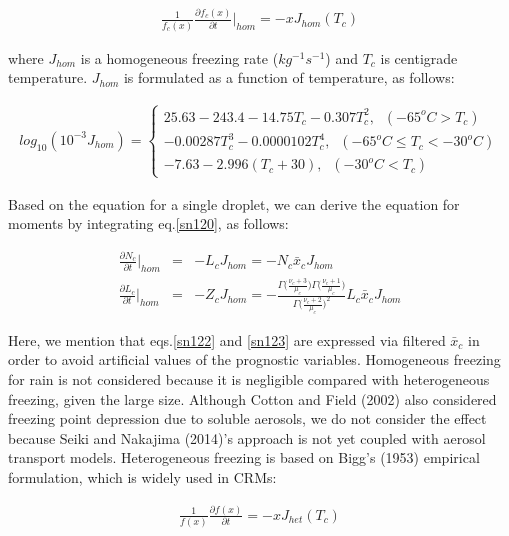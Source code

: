 \begin{eqnarray}
\frac{1}{f_{c}(x)}\frac{\partial f_{c}(x)}{\partial t}\Bigr|_{hom}=-xJ_{hom}(T_{c})\label{sn120}
\end{eqnarray}

where $J_{hom}$ is a homogeneous freezing rate ($kg^{-1}s^{-1}$) and $T_{c}$ is centigrade temperature. $J_{hom}$ is formulated as a function of temperature, as follows:

\begin{eqnarray}
log_{10}(10^{-3}J_{hom})=
\left\{
\begin{array}{l}
25.63-243.4-14.75T_{c}-0.307T_{c}^{2},\;\;(-65^{o}C>T_{c}) \nonumber \\
-0.00287T_{c}^{3}-0.0000102T_{c}^{4},\;\;(-65^{o}C\leq T_{c}<-30^{o}C)\nonumber \\
-7.63-2.996(T_{c}+30),\;\;(-30^{o}C< T_{c})\nonumber
\end{array}
\label{sn121}
\right.
\end{eqnarray}

Based on the equation for a single droplet, we can derive the equation for moments by integrating eq.\ref{sn120}, as follows:

\begin{eqnarray}
\frac{\partial N_{c}}{\partial t}\Bigr|_{hom}&=&-L_{c}J_{hom}=-N_{c}\bar{x}_{c}J_{hom}\label{sn122}\\
\frac{\partial L_{c}}{\partial t}\Bigr|_{hom}&=&-Z_{c}J_{hom}=-\frac{\Gamma\bigl(\frac{\nu_{c}+3}{\mu_{c}}\bigr)\Gamma\bigl(\frac{\nu_{c}+1}{\mu_{c}}\bigr)}{\Gamma\bigl(\frac{\nu_{c}+2}{\mu_{c}}\bigr)^{2}}L_{c}\bar{x}_{c}J_{hom}\label{sn123}
\end{eqnarray}

Here, we mention that eqs.\ref{sn122} and \ref{sn123} are expressed via filtered $\bar{x}_{c}$ in order to avoid artificial values of the prognostic variables. Homogeneous freezing for rain is not considered because it is negligible compared with heterogeneous freezing, given the large size. Although Cotton and Field (2002) also considered freezing point depression due to soluble aerosols, we do not consider the effect because Seiki and Nakajima (2014)’s approach is not yet coupled with aerosol transport models.
Heterogeneous freezing is based on Bigg’s (1953) empirical formulation, which is widely used in CRMs:

\begin{eqnarray}
\frac{1}{f(x)}\frac{\partial f(x)}{\partial t}=-xJ_{het}(T_{c})\label{sn124}
\end{eqnarray}

